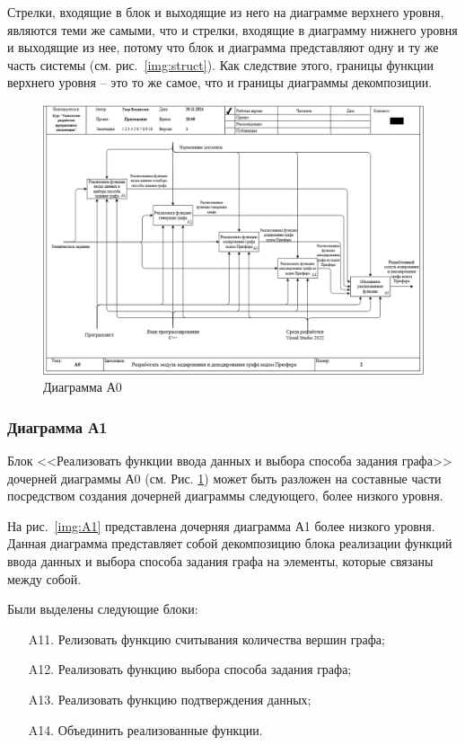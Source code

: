\documentclass[a4paper, final]{article}
\begin{document}
Стрелки, входящие в блок и выходящие из него на диаграмме верхнего уровня, являются теми же самыми, что и стрелки, 
входящие в диаграмму нижнего уровня и выходящие из нее, потому что блок и диаграмма представляют одну и ту же 
часть системы (см. рис.~\ref{img:struct}). Как следствие этого, границы функции верхнего уровня 
-- это то же самое, что и границы диаграммы декомпозиции.

\newpage
\begin{figure}[H]
	\centering
	\includegraphics[width=\linewidth]{A0.png}
	\caption{Диаграмма А0}
	\label{img:A0}
\end{figure}


\subsubsection{Диаграмма А1}
Блок <<Реализовать функции ввода данных и выбора способа задания графа>> дочерней диаграммы А0 (см. Рис. \ref{img:A0}) может 
быть разложен на составные части посредством создания дочерней диаграммы следующего, более низкого уровня.

На рис.~\ref{img:A1} представлена дочерняя диаграмма А1 более низкого уровня. Данная диаграмма представляет собой 
декомпозицию блока реализации функций ввода данных и выбора способа задания графа на элементы, которые связаны 
между собой. 

Были выделены следующие блоки:
\begin{itemize}
	\item[A11.] Релизовать функцию считывания количества вершин графа;
	\item[A12.] Реализовать функцию выбора способа задания графа;
	\item[A13.] Реализовать функцию подтверждения данных;
	\item[A14.] Объединить реализованные функции.
\end{itemize} 
\end{document}
